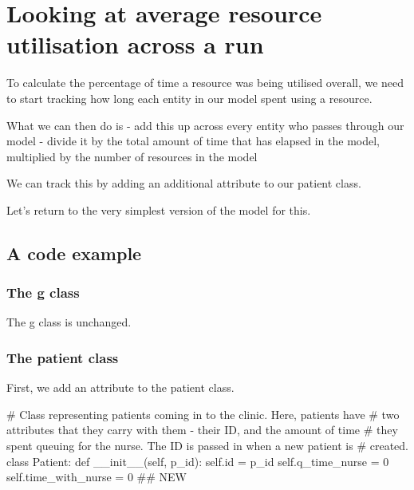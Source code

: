 \documentclass[
  letterpaper,
  DIV=11,
  numbers=noendperiod]{scrreprt}
\newenvironment{Shaded}{\begin{snugshade}}{\end{snugshade}}
\newcommand{\BuiltInTok}[1]{\textcolor[rgb]{0.00,0.23,0.31}{#1}}
\newcommand{\CommentTok}[1]{\textcolor[rgb]{0.37,0.37,0.37}{#1}}
\newcommand{\DecValTok}[1]{\textcolor[rgb]{0.68,0.00,0.00}{#1}}
\newcommand{\FunctionTok}[1]{\textcolor[rgb]{0.28,0.35,0.67}{#1}}
\newcommand{\KeywordTok}[1]{\textcolor[rgb]{0.00,0.23,0.31}{#1}}
\newcommand{\NormalTok}[1]{\textcolor[rgb]{0.00,0.23,0.31}{#1}}
\newcommand{\OperatorTok}[1]{\textcolor[rgb]{0.37,0.37,0.37}{#1}}
\newcommand{\VariableTok}[1]{\textcolor[rgb]{0.07,0.07,0.07}{#1}}
\begin{document}
\section{Looking at average resource utilisation across a
run}\label{looking-at-average-resource-utilisation-across-a-run}

To calculate the percentage of time a resource was being utilised
overall, we need to start tracking how long each entity in our model
spent using a resource.

What we can then do is - add this up across every entity who passes
through our model - divide it by the total amount of time that has
elapsed in the model, multiplied by the number of resources in the model

We can track this by adding an additional attribute to our patient
class.

Let's return to the very simplest version of the model for this.

\subsection{A code example}\label{a-code-example}

\subsubsection{The g class}\label{the-g-class-6}

The g class is unchanged.

\subsubsection{The patient class}\label{the-patient-class-6}

First, we add an attribute to the patient class.

\begin{Shaded}
\begin{Highlighting}[]
\CommentTok{\# Class representing patients coming in to the clinic.  Here, patients have}
\CommentTok{\# two attributes that they carry with them {-} their ID, and the amount of time}
\CommentTok{\# they spent queuing for the nurse.  The ID is passed in when a new patient is}
\CommentTok{\# created.}
\KeywordTok{class}\NormalTok{ Patient:}
    \KeywordTok{def} \FunctionTok{\_\_init\_\_}\NormalTok{(}\VariableTok{self}\NormalTok{, p\_id):}
        \VariableTok{self}\NormalTok{.}\BuiltInTok{id} \OperatorTok{=}\NormalTok{ p\_id}
        \VariableTok{self}\NormalTok{.q\_time\_nurse }\OperatorTok{=} \DecValTok{0}
        \VariableTok{self}\NormalTok{.time\_with\_nurse }\OperatorTok{=} \DecValTok{0} \CommentTok{\#\# NEW}
\end{Highlighting}
\end{Shaded}
\end{document}

